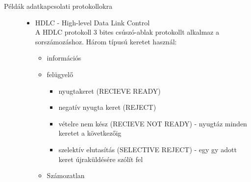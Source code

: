 \documentclass[margin=0px]{article}
\begin{document}
\begin{description}
\begin{description}
            \item[Példák adatkapcsolati protokollokra] \hfill
                \begin{itemize}
                    \item HDLC - High-level Data Link Control \\
                          A HDLC protokoll 3 bites csúszó-ablak protokollt alkalmaz  a sorszámozáshoz.
                          Három típusú keretet használ:
                          \begin{itemize}
                              \item információs
                              \item felügyelő
                                    \begin{itemize}
                                        \item nyugtakeret (RECIEVE READY)
                                        \item negatív nyugta keret (REJECT)
                                        \item vételre nem kész (RECIEVE NOT READY) - nyugtáz minden keretet a következőig
                                        \item szelektív elutasítás (SELECTIVE REJECT) - egy gy adott keret újraküldésére szólít fel
                                    \end{itemize}
                              \item Számozatlan
                          \end{itemize}


\end{itemize}
\end{description}
\end{description}
\end{document}
